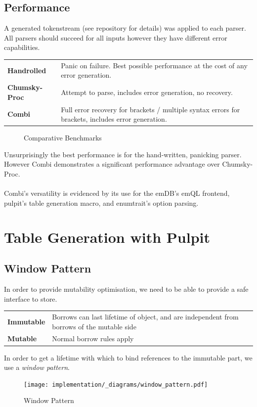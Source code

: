 \subsection{Performance}
A generated tokenstream (see repository for details) was applied to each parser. All parsers should succeed for all inputs however they have different error capabilities.
\begin{center}
    \begin{tabular}{l p{}}
        \textbf{Handrolled}   & Panic on failure. Best possible performance at the cost of any error generation.                   \\
        \textbf{Chumsky-Proc} & Attempt to parse, includes error generation, no recovery.                                          \\
        \textbf{Combi}        & Full error recovery for brackets / multiple syntax errors for brackets, includes error generation. \\
    \end{tabular}
\end{center}
\begin{figure}[h!]
    \centering
    \vspace{-0.4em}
    \resizebox{\textwidth}{!}{}
    \caption{Comparative Benchmarks}
\end{figure}
Unsurprisingly the best performance is for the hand-written, panicking parser.  However Combi demonstrates a significant performance advantage over Chumsky-Proc.
\\
\\ Combi's versatility is evidenced by its use for the emDB's emQL frontend, pulpit's table generation macro, and enumtrait's option parsing.
\section{Table Generation with Pulpit}

\subsection{Window Pattern}
\label{sec:window_pattern}
In order to provide mutability optimisation, we need to be able to provide a safe interface to store.
\begin{center}
    \begin{tabular}{l p{}}
        \textbf{Immutable} & Borrows can last lifetime of object, and are independent from borrows of the mutable side \\
        \textbf{Mutable}   & Normal borrow rules apply                                                                 \\
    \end{tabular}
\end{center}
In order to get a lifetime with which to bind references to the immutable part, we use a \textit{window pattern}.
\begin{figure}[h!]
    \centering
    \texttt{[image: implementation/\_diagrams/window\_pattern.pdf]}
    \caption{Window Pattern}
\end{figure}
